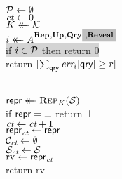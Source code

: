 \begin{figure}[t]
  {
     \\[2pt]
      $\mathcal{P} \gets \emptyset$\\
      $\textit{ct} \gets 0$ \\
      $K \mathrel{\leftarrow\mkern-14mu\leftarrow} \mathcal{K}$\\
      $i \getsr \advA^{\REPO,\UPO,\QRYO\highlighto{,\REVO}}$\\
      \colorbox{lightgray}{if $i \in \mathcal{P}$ then return 0} \\[2.0pt]
      return $[\sum_{\mathsf{qry}} \textit{err}_i[\mathsf{qry}] \geq r]$ 
 }
{
    \oraclev{$\REPO(\col)$}\\[2pt]
      $\mathsf{repr} \mathrel{\leftarrow\mkern-14mu\leftarrow} \textsc{Rep}_K(\mathcal{S})$\\
      if $\mathsf{repr} = \bot$ return $\bot$\\
      $\textit{ct}\gets\textit{ct}+1$ \\
      $\mathsf{repr}_{\textit{ct}} \gets \mathsf{repr}$\\
      $\mathcal{C}_{\textit{ct}} \gets \emptyset$\\
      $\mathcal{S}_{\textit{ct}} \gets \mathcal{S}$\\
      $\mathrm{rv} \gets \mathsf{repr}_{\textit{ct}}$  \\
      return $\mathrm{rv}$

      \medskip

}
\end{figure}

